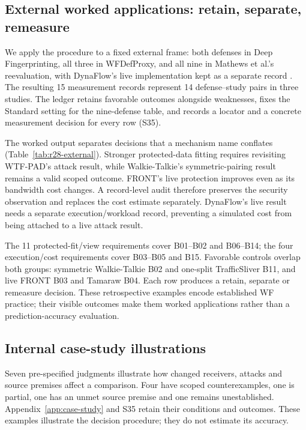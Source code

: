 \subsection{External worked applications: retain, separate, remeasure}\label{sec:utility-b}
We apply the procedure to a fixed external frame: both defenses in Deep Fingerprinting, all three in WFDefProxy, and all nine in Mathews et al.'s reevaluation, with DynaFlow's live implementation kept as a separate record \cite{sirinam2018deep,gong2021wfdefproxy,mathews2023critical}. The resulting 15 measurement records represent 14 defense--study pairs in three studies. The ledger retains favorable outcomes alongside weaknesses, fixes the Standard setting for the nine-defense table, and records a locator and a concrete measurement decision for every row (S35).

The worked output separates decisions that a mechanism name conflates (Table~\ref{tab:r28-external}). Stronger protected-data fitting requires revisiting WTF-PAD's attack result, while Walkie-Talkie's symmetric-pairing result remains a valid scoped outcome. FRONT's live protection improves even as its bandwidth cost changes. A record-level audit therefore preserves the security observation and replaces the cost estimate separately. DynaFlow's live result needs a separate execution/workload record, preventing a simulated cost from being attached to a live attack result.

The 11 protected-fit/view requirements cover B01--B02 and B06--B14; the four execution/cost requirements cover B03--B05 and B15. Favorable controls overlap both groups: symmetric Walkie-Talkie B02 and one-split TrafficSliver B11, and live FRONT B03 and Tamaraw B04. Each row produces a retain, separate or remeasure decision. These retrospective examples encode established WF practice; their visible outcomes make them worked applications rather than a prediction-accuracy evaluation.


\subsection{Internal case-study illustrations}\label{sec:utility-c}
Seven pre-specified judgments illustrate how changed receivers, attacks and source premises affect a comparison. Four have scoped counterexamples, one is partial, one has an unmet source premise and one remains unestablished. Appendix~\ref{app:case-study} and S35 retain their conditions and outcomes. These examples illustrate the decision procedure; they do not estimate its accuracy.
